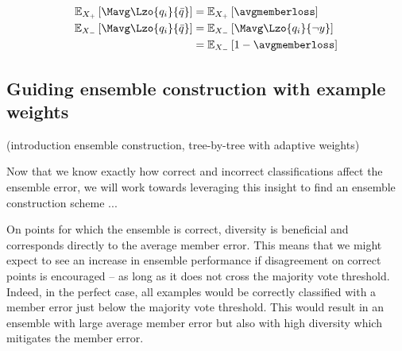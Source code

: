 \documentclass[../main.tex]{subfiles}
\begin{document}

\begin{align*}
\mathbb{E}_{X_{+}}\left[ \Mavg \Lzo{q_{i}}{\bar{q}} \right] &=
\mathbb{E}_{X_{+}}\left[ \avgmemberloss \right]   \\
\mathbb{E}_{X_{-}}\left[ \Mavg \Lzo{q_{i}}{\bar{q}} \right]  &= \mathbb{E}_{X_{-}}\left[ \Mavg  \Lzo{q_{i}}{\neg y} \right]  \\
&=
\mathbb{E}_{X_{-}}\left[ 1 - \avgmemberloss \right]
\end{align*}


\subsection{Guiding ensemble construction with example weights}
\label{sec:guiding-ensemble-construction-with-example-weights}

(introduction ensemble construction, tree-by-tree with adaptive weights)

Now that we know exactly how correct and incorrect classifications affect the ensemble error, we will work towards leveraging this insight to find an ensemble construction scheme ...


On points for which the ensemble is correct, diversity is beneficial and corresponds directly to the average member error. This means that we might expect to see an increase in ensemble performance if disagreement on correct points is encouraged -- as long as it does not cross the majority vote threshold. Indeed, in the perfect case, all examples would be correctly classified with a member error just below the majority vote threshold. This would result in an ensemble with large average member error but also with high diversity which mitigates the member error.

\end{document}
